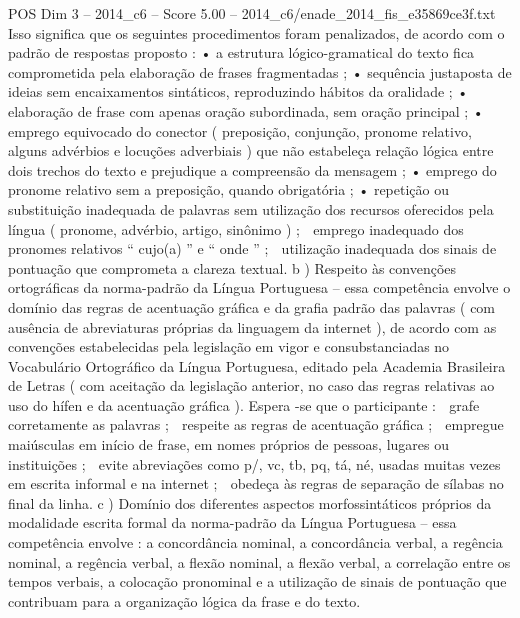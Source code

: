 \begin{textsample}{POS Dim 3 – 2014\_c6 – Score 5.00 – 2014\_c6/enade\_2014\_fis\_e35869ce3f.txt}
Isso significa que os seguintes procedimentos foram penalizados, de acordo com o padrão de respostas proposto : • a estrutura lógico-gramatical do texto fica comprometida pela elaboração de frases fragmentadas ; • sequência justaposta de ideias sem encaixamentos sintáticos, reproduzindo hábitos da oralidade ; • elaboração de frase com apenas oração subordinada, sem oração principal ; • emprego equivocado do conector ( preposição, conjunção, pronome relativo, alguns advérbios e locuções adverbiais ) que não estabeleça relação lógica entre dois trechos do texto e prejudique a compreensão da mensagem ; • emprego do pronome relativo sem a preposição, quando obrigatória ; • repetição ou substituição inadequada de palavras sem utilização dos recursos oferecidos pela língua ( pronome, advérbio, artigo, sinônimo ) ;  emprego inadequado dos pronomes relativos “ cujo(a) ” e “ onde ” ;  utilização inadequada dos sinais de pontuação que comprometa a clareza textual. b ) Respeito às convenções ortográficas da norma-padrão da Língua Portuguesa – essa competência envolve o domínio das regras de acentuação gráfica e da grafia padrão das palavras ( com ausência de abreviaturas próprias da linguagem da internet ), de acordo com as convenções estabelecidas pela legislação em vigor e consubstanciadas no Vocabulário Ortográfico da Língua Portuguesa, editado pela Academia Brasileira de Letras ( com aceitação da legislação anterior, no caso das regras relativas ao uso do hífen e da acentuação gráfica ).
Espera -se que o participante :  grafe corretamente as palavras ;  respeite as regras de acentuação gráfica ;  empregue maiúsculas em início de frase, em nomes próprios de pessoas, lugares ou instituições ;  evite abreviações como p/, vc, tb, pq, tá, né, usadas muitas vezes em escrita informal e na internet ;  obedeça às regras de separação de sílabas no final da linha. c ) Domínio dos diferentes aspectos morfossintáticos próprios da modalidade escrita formal da norma-padrão da Língua Portuguesa – essa competência envolve : a concordância nominal, a concordância verbal, a regência nominal, a regência verbal, a flexão nominal, a flexão verbal, a correlação entre os tempos verbais, a colocação pronominal e a utilização de sinais de pontuação que contribuam para a organização lógica da frase e do texto.

\end{textsample}
